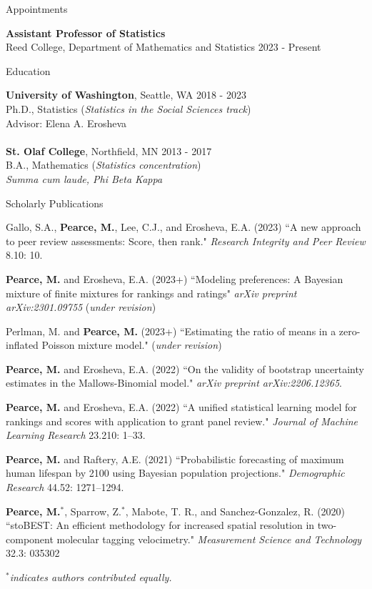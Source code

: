 \documentclass{resume} %
\begin{document}

\begin{rSection}{Appointments}

\textbf{Assistant Professor of Statistics}
\\ Reed College, Department of Mathematics and Statistics \hfill{2023 - Present}
\end{rSection}

\begin{rSection}{Education}

\textbf{University of Washington}, Seattle, WA \hfill {2018 - 2023} 
\\ Ph.D., Statistics ({\it Statistics in the Social Sciences track})
\\ Advisor: Elena A. Erosheva
\\
\\\textbf{St. Olaf College}, Northfield, MN \hfill {2013 - 2017} 
\\ B.A., Mathematics ({\it Statistics concentration})
\\ {\it Summa cum laude, Phi Beta Kappa}
\end{rSection}


\begin{rSection}{Scholarly Publications}

Gallo, S.A., \textbf{Pearce, M.}, Lee, C.J., and Erosheva, E.A. (2023) ``A new approach to peer review assessments: Score, then rank." \textit{Research Integrity and Peer Review} 8.10: 10.

\textbf{Pearce, M.} and Erosheva, E.A. (2023+) ``Modeling preferences: A Bayesian mixture of finite mixtures for rankings and ratings" \textit{arXiv preprint arXiv:2301.09755} (\textit{under revision})

Perlman, M. and \textbf{Pearce, M.} (2023+) ``Estimating the ratio of means in a zero-inflated Poisson mixture model." (\textit{under revision})

\textbf{Pearce, M.} and Erosheva, E.A. (2022) ``On the validity of bootstrap uncertainty estimates in the Mallows-Binomial model." \textit{arXiv preprint arXiv:2206.12365}.

\textbf{Pearce, M.} and Erosheva, E.A. (2022) ``A unified statistical learning model for rankings and scores with application to grant panel review." \textit{Journal of Machine Learning Research} 23.210: 1--33.

\textbf{Pearce, M.} and Raftery, A.E. (2021) ``Probabilistic forecasting of maximum human lifespan by 2100 using Bayesian population projections." {\em Demographic Research} 44.52: 1271--1294.

\textbf{Pearce, M.}$^*$, Sparrow, Z.$^*$, Mabote, T. R., and Sanchez-Gonzalez, R. (2020) ``stoBEST: An efficient methodology for increased spatial resolution in two-component molecular tagging velocimetry." {\em Measurement Science and Technology} 32.3: 035302

{\em $^*$indicates authors contributed equally.}
\end{rSection}
\end{document}
